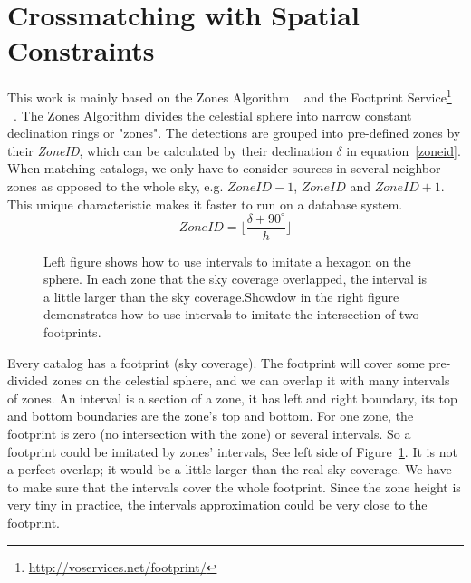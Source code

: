 \section{Crossmatching with Spatial Constraints}
This work is mainly based on the Zones Algorithm ~\citep{DBLP:journals/corr/abs-cs-0701171} and the Footprint Service\footnote{\url{http://voservices.net/footprint/}} ~\citep{2007ASPC..376..559B}. The Zones Algorithm divides the celestial sphere into narrow constant declination rings or "zones". The detections are grouped into pre-defined zones by their \textit{ZoneID}, which can be calculated by their declination $\delta$ in equation~\ref{zoneid}. When matching catalogs, we only have to consider sources in several neighbor zones as opposed to the whole sky, e.g. $ZoneID-1$, $ZoneID$ and $ZoneID+1$. This unique characteristic makes it faster to run on a database system.
\begin{equation}\label{zoneid}
ZoneID=\lfloor{\frac{\delta + 90^\circ}{h}}\rfloor
\end{equation}

\begin{figure}
\begin{center}
\caption{{Left figure shows how to use intervals to imitate a hexagon on the sphere. In each zone that the sky coverage overlapped, the interval is a little larger than the sky coverage.}{Showdow in the right figure demonstrates how to use intervals to imitate the intersection of two footprints.}\label{P046_f2}}
\end{center}
\end{figure}

Every catalog has a footprint (sky coverage). The footprint will cover some pre-divided zones on the celestial sphere, and we can overlap it with many intervals of zones. An interval is a section of a zone, it has left and right boundary, its top and bottom boundaries are the zone's top and bottom. For one zone, the footprint is zero (no intersection with the zone) or several intervals. So a footprint could be imitated by zones' intervals, See left side of Figure~\ref{P046_f2}. It is not a perfect overlap; it would be a little larger than the real sky coverage. We have to make sure that the intervals cover the whole footprint. Since the zone height is very tiny in practice, the intervals approximation could be very close to the footprint.


